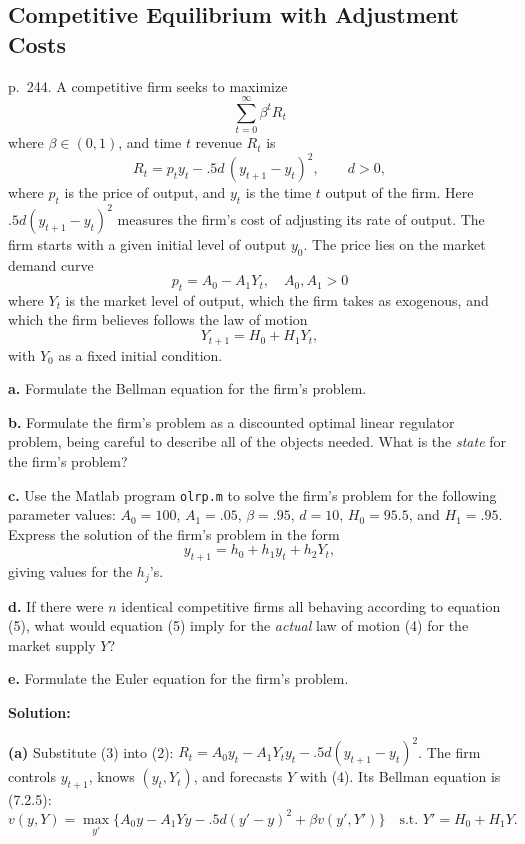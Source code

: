 \documentclass[12pt, letterpaper]{article}
\begin{document}
\subsection{Competitive Equilibrium with Adjustment Costs}

\begin{tcolorbox}[oddbox,title={Exercise 7.1 \quad A competitive firm}]
\begin{tcolorbox}[questionbox]
p.~244. A competitive firm seeks to maximize
\[
\sum_{t=0}^\infty\beta^tR_t \tag{1}
\]
where $\beta\in(0,1)$, and time $t$ revenue $R_t$ is
\[
R_t=p_ty_t-.5d\,(y_{t+1}-y_t)^2,\qquad d>0, \tag{2}
\]
where $p_t$ is the price of output, and $y_t$ is the time $t$ output of the firm. Here
$.5d(y_{t+1}-y_t)^2$ measures the firm's cost of adjusting its rate of output. The firm starts with a
given initial level of output $y_0$. The price lies on the market demand curve
\[
p_t=A_0-A_1Y_t,\quad A_0,A_1>0 \tag{3}
\]
where $Y_t$ is the market level of output, which the firm takes as exogenous, and which the firm
believes follows the law of motion
\[
Y_{t+1}=H_0+H_1Y_t, \tag{4}
\]
with $Y_0$ as a fixed initial condition.

\textbf{a.} Formulate the Bellman equation for the firm's problem.

\textbf{b.} Formulate the firm's problem as a discounted optimal linear regulator problem, being
careful to describe all of the objects needed. What is the \emph{state} for the firm's problem?

\textbf{c.} Use the Matlab program \texttt{olrp.m} to solve the firm's problem for the following
parameter values: $A_0=100$, $A_1=.05$, $\beta=.95$, $d=10$, $H_0=95.5$, and $H_1=.95$. Express the
solution of the firm's problem in the form
\[
y_{t+1}=h_0+h_1y_t+h_2Y_t, \tag{5}
\]
giving values for the $h_j$'s.

\textbf{d.} If there were $n$ identical competitive firms all behaving according to equation (5),
what would equation (5) imply for the \emph{actual} law of motion (4) for the market supply $Y$?

\textbf{e.} Formulate the Euler equation for the firm's problem.
\end{tcolorbox}

\textbf{Solution:}

\textbf{(a)} Substitute (3) into (2): $R_t=A_0y_t-A_1Y_ty_t-.5d(y_{t+1}-y_t)^2$. The firm controls
$y_{t+1}$, knows $(y_t,Y_t)$, and forecasts $Y$ with (4). Its Bellman equation is (7.2.5):
\[
\boxed{v(y,Y)=\max_{y'}\Big\{A_0y-A_1Yy-.5d(y'-y)^2+\beta v(y',Y')\Big\}\quad\text{s.t. }Y'=H_0+H_1Y.}
\]


\end{tcolorbox}
\end{document}

